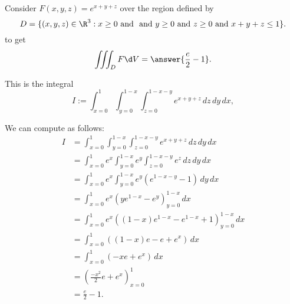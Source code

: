 \documentclass{ximera}
\author{Jim Fowler}
\begin{document}
\begin{exercise}
Consider $F(x,y,z) = e^{x+y+z}$ over the region defined by
$$
D = \{ (x,y,z) \in \R^3 : x \geq 0 \mbox{ and } \mbox{ and } y \geq 0
\mbox{ and } z \geq 0 \mbox{ and } x+y+z \leq 1 \}.
$$
to get
\[
  \iiint_D F \d V = \answer{\frac{e}{2} - 1}.
\]

\begin{hint}
This is the integral
$$
I := \int_{x=0}^1 \int_{y=0}^{1-x} \int_{z=0}^{1-x-y} e^{x+y+z} \, dz \, dy \, dx,
$$
\end{hint}
\begin{hint}
We can compute as follows:
\begin{align*}
  I
&= \int_{x=0}^1 \int_{y=0}^{1-x} \int_{z=0}^{1-x-y} e^{x+y+z} \, dz \, dy \, dx \\
&= \int_{x=0}^1 e^x \int_{y=0}^{1-x} e^y \int_{z=0}^{1-x-y} e^z \, dz \, dy \, dx \\
&= \int_{x=0}^1 e^x \int_{y=0}^{1-x} e^y (e^{1-x-y} - 1) \, dy \, dx \\
&= \int_{x=0}^1 e^x (y e^{1-x} - e^y)_{y=0}^{1-x} \, dx \\
&= \int_{x=0}^1 e^x ((1-x) e^{1-x} - e^{1-x} + 1)_{y=0}^{1-x} \, dx \\
&= \int_{x=0}^1 ((1-x) e - e + e^x) \, dx \\
&= \int_{x=0}^1 (-xe + e^x) \, dx \\
&= \left( \frac{-x^2}{2} e + e^x \right)_{x=0}^{1} \\
&= \frac{e}{2} - 1.
\end{align*}
\end{hint}
\end{exercise}
\end{document}
